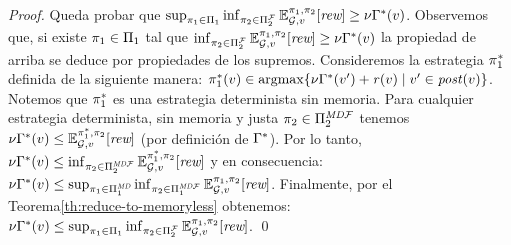 \begin{proof}
  Queda probar que $\sup_{\pi_{1} \in \Pi_{1}}   \inf_{\pi_{2} \in \Pi^{\mathcal{F}}_{2}}  \mathbb{E}^{\pi_{1}, \pi_{2}}_{\mathcal{G},v}[\textit{rew}] \geq \nu \Gamma^*(v)$. Observemos que, si existe  $\pi_{1} \in \Pi_{1}$ tal que
  $\inf_{\pi_{2} \in \Pi^{\mathcal{F}}_{2}}  \mathbb{E}^{\pi_{1}, \pi_{2}}_{\mathcal{G},v}[\textit{rew}] \geq \nu \Gamma^*(v)$ la propiedad de arriba se deduce por propiedades de los supremos. Consideremos la estrategia $\pi^*_{1}$ definida de la siguiente manera:
  $\pi^*_{1}(v) \in \operatorname*{argmax} \{\nu \Gamma^*(v') + \mathit{r}(v) \mid v' \in \mathit{post}(v) \}$. Notemos que $\pi^*_{1}$ es una estrategia determinista sin memoria. Para cualquier estrategia determinista, sin memoria y justa $\pi_{2} \in \Pi^{\textit{MD}\mathcal{F}}_{2}$ tenemos
  $\nu \Gamma^*(v) \leq \mathbb{E}^{\pi^*_{1}, \pi_{2}}_{\mathcal{G},v}[\textit{rew}]$ (por definición de $\Gamma^*$).  Por lo tanto,
  $\nu \Gamma^*(v) \leq \inf_{\pi_{2} \in \Pi^{\textit{MD}\mathcal{F}}_{2}} \mathbb{E}^{\pi^*_{1}, \pi_{2}}_{\mathcal{G},v}[\textit{rew}]$
  y en consecuencia:
  $\nu \Gamma^*(v) \leq \sup_{\pi_{1} \in \Pi^{\textit{MD}}_{1}} \inf_{\pi_{2} \in \Pi^{\textit{MD}\mathcal{F}}_{1}} \mathbb{E}^{\pi_{1}, \pi_{2}}_{\mathcal{G},v}[\textit{rew}]$.
  Finalmente, por el Teorema\ref{th:reduce-to-memoryless} obtenemos:
  $\nu \Gamma^*(v) \leq \sup_{\pi_{1} \in \Pi_{1}} \inf_{\pi_{2} \in \Pi^{\mathcal{F}}_{2}} \mathbb{E}^{\pi_{1}, \pi_{2}}_{\mathcal{G},v}[\textit{rew}]$.
  \qed
\end{proof}
%
